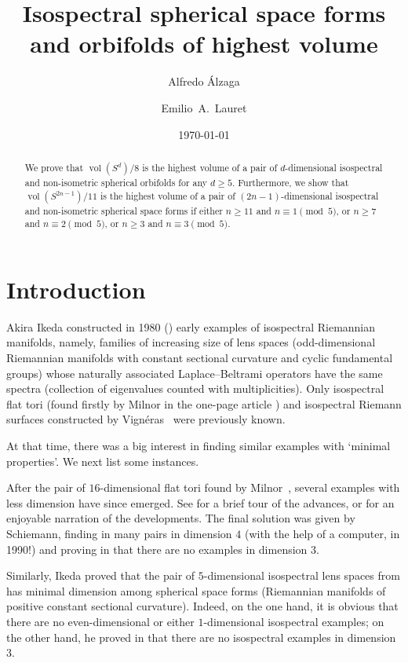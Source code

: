 \documentclass[12pt,a4paper,final]{amsart}
\title[Isospectral spherical space forms and orbifolds]{Isospectral spherical space forms and orbifolds of highest volume}
\author{Alfredo Álzaga}
\author{Emilio~A.~Lauret}
\date{\today}
\theoremstyle{plain}
\theoremstyle{definition}
\theoremstyle{remark}
\numberwithin{equation}{section}
\begin{document}
\begin{abstract}
We prove that $\operatorname{vol}(S^{d})/8$ is the highest volume of a pair of $d$-dimensional isospectral and non-isometric spherical orbifolds for any $d\geq5$. 
Furthermore, we show that
$\operatorname{vol}(S^{2n-1})/11$ is the highest volume of a pair of $(2n-1)$-dimensional isospectral and non-isometric spherical space forms
if either 
$n\geq11$ and $n\equiv 1\pmod 5$, 
or $n\geq7$ and $n\equiv 2\pmod 5$, 
or $n\geq3$ and $n\equiv 3\pmod 5$. 
\end{abstract} 

\maketitle

\tableofcontents
	
\section{Introduction}


Akira Ikeda constructed in 1980 (\cite{Ikeda80_isosp-lens}) early examples of isospectral Riemannian manifolds, namely, families of increasing size of lens spaces (odd-dimensional Riemannian manifolds with constant sectional curvature and cyclic fundamental groups) whose naturally associated Laplace--Beltrami operators have the same spectra (collection of eigenvalues counted with multiplicities). 
Only isospectral flat tori (found firstly by Milnor in the one-page article \cite{Milnor64}) and isospectral Riemann surfaces constructed by Vign\'{e}ras~\cite{Vigneras80} were previously known. 

At that time, there was a big interest in finding similar examples with `minimal properties'.
We next list some instances. 

After the pair of $16$-dimensional flat tori found by Milnor~\cite{Milnor64}, several examples with less dimension have since emerged. 
See \cite[page xxix]{ConwaySloane-book} for a brief tour of the advances, or \cite{RowlettNilssonRydell-flattori} for an enjoyable narration of the developments. 
The final solution was given by Schiemann, finding in \cite{Schiemann90} many pairs in dimension $4$ (with the help of a computer, in 1990!) and proving in \cite{Schiemann97} that there are no examples in dimension $3$. 

Similarly, Ikeda proved that the pair of $5$-dimensional isospectral lens spaces from \cite{Ikeda80_isosp-lens} has minimal dimension among spherical space forms (Riemannian manifolds of positive constant sectional curvature). 
Indeed, on the one hand, it is obvious that there are no even-dimensional or either $1$-dimensional isospectral examples; on the other hand, he proved in \cite{Ikeda80_3-dimI} that there are no isospectral examples in dimension $3$. 
\end{document}

